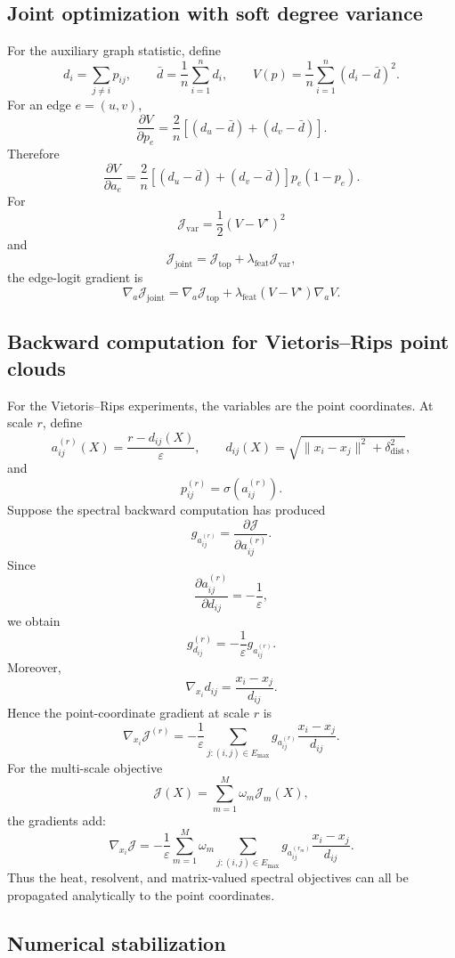 \documentclass[pdflatex,sn-mathphys-num]{sn-jnl}%
\theoremstyle{thmstyleone}%
\theoremstyle{thmstyletwo}%
\theoremstyle{thmstylethree}%
\begin{document}
\begin{appendices}
\subsection{Joint optimization with soft degree variance}

For the auxiliary graph statistic, define
\[
d_i=\sum_{j\neq i}p_{ij},
\qquad
\bar d=\frac1n\sum_{i=1}^{n}d_i,
\qquad
V(p)
=
\frac1n
\sum_{i=1}^{n}
(d_i-\bar d)^2.
\]
For an edge \(e=(u,v)\),
\[
\frac{\partial V}{\partial p_e}
=
\frac2n
\left[
(d_u-\bar d)
+
(d_v-\bar d)
\right].
\]
Therefore
\[
\frac{\partial V}{\partial a_e}
=
\frac2n
\left[
(d_u-\bar d)
+
(d_v-\bar d)
\right]
p_e(1-p_e).
\]
For
\[
\mathcal J_{\mathrm{var}}
=
\frac12(V-V^\star)^2
\]
and
\[
\mathcal J_{\mathrm{joint}}
=
\mathcal J_{\mathrm{top}}
+
\lambda_{\mathrm{feat}}
\mathcal J_{\mathrm{var}},
\]
the edge-logit gradient is
\[
\nabla_a\mathcal J_{\mathrm{joint}}
=
\nabla_a\mathcal J_{\mathrm{top}}
+
\lambda_{\mathrm{feat}}
(V-V^\star)
\nabla_aV.
\]

\subsection{Backward computation for Vietoris--Rips point clouds}

For the Vietoris--Rips experiments, the variables are the point coordinates. At scale \(r\), define
\[
a_{ij}^{(r)}(X)
=
\frac{r-d_{ij}(X)}{\varepsilon},
\qquad
d_{ij}(X)
=
\sqrt{
\|x_i-x_j\|^2
+
\delta_{\mathrm{dist}}^2
},
\]
and
\[
p_{ij}^{(r)}
=
\sigma(a_{ij}^{(r)}).
\]
Suppose the spectral backward computation has produced
\[
g_{a_{ij}^{(r)}}
=
\frac{\partial\mathcal J}
{\partial a_{ij}^{(r)}}.
\]
Since
\[
\frac{\partial a_{ij}^{(r)}}{\partial d_{ij}}
=
-\frac1{\varepsilon},
\]
we obtain
\[
g_{d_{ij}}^{(r)}
=
-\frac1{\varepsilon}
g_{a_{ij}^{(r)}}.
\]
Moreover,
\[
\nabla_{x_i}d_{ij}
=
\frac{x_i-x_j}{d_{ij}}.
\]
Hence the point-coordinate gradient at scale \(r\) is
\[
\nabla_{x_i}\mathcal J^{(r)}
=
-\frac1{\varepsilon}
\sum_{j:(i,j)\in E_{\max}}
g_{a_{ij}^{(r)}}
\frac{x_i-x_j}{d_{ij}}.
\]
For the multi-scale objective
\[
\mathcal J(X)
=
\sum_{m=1}^{M}
\omega_m
\mathcal J_m(X),
\]
the gradients add:
\[
\nabla_{x_i}\mathcal J
=
-\frac1{\varepsilon}
\sum_{m=1}^{M}
\omega_m
\sum_{j:(i,j)\in E_{\max}}
g_{a_{ij}^{(r_m)}}
\frac{x_i-x_j}{d_{ij}}.
\]
Thus the heat, resolvent, and matrix-valued spectral objectives can all be propagated analytically to the point coordinates.

\subsection{Numerical stabilization}


\end{appendices}
\end{document}
